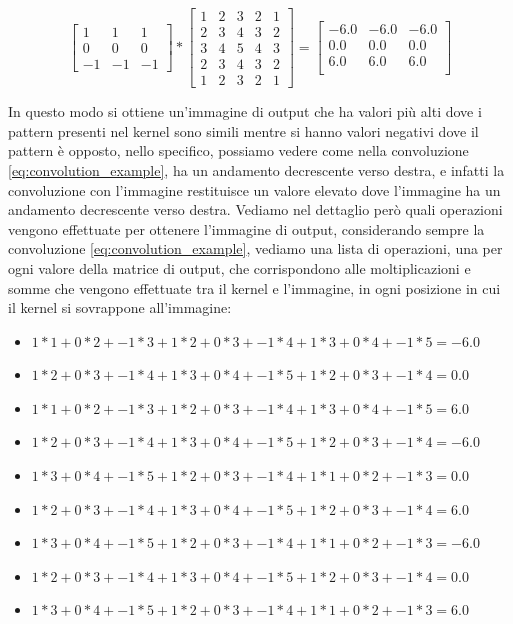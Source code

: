 \begin{equation}
    \label{eq:convolution_example_2}
    \begin{bmatrix}
        1 & 1 & 1 \\
        0 & 0 & 0 \\
        -1 & -1 & -1
    \end{bmatrix} *
    \begin{bmatrix}
        1 & 2 & 3 & 2 & 1 \\
        2 & 3 & 4 & 3 & 2 \\
        3 & 4 & 5 & 4 & 3 \\
        2 & 3 & 4 & 3 & 2 \\
        1 & 2 & 3 & 2 & 1
    \end{bmatrix} =
    \begin{bmatrix}
        -6.0 & -6.0 & -6.0 \\
        0.0 & 0.0 & 0.0 \\
        6.0 & 6.0 & 6.0 \\
    \end{bmatrix}
\end{equation}

In questo modo si ottiene un'immagine di output che ha valori più alti dove i pattern 
presenti nel kernel sono simili mentre si hanno valori negativi dove il pattern è opposto, nello specifico,
possiamo vedere come nella convoluzione \ref{eq:convolution_example}, ha un andamento decrescente verso destra, e infatti la convoluzione 
con l'immagine restituisce un valore elevato dove l'immagine ha un andamento decrescente verso destra.
Vediamo nel dettaglio però quali operazioni vengono effettuate per ottenere l'immagine di output, considerando sempre la convoluzione \ref{eq:convolution_example}, vediamo
una lista di operazioni, una per ogni valore della matrice di output, che corrispondono alle moltiplicazioni e somme che vengono effettuate tra il kernel e l'immagine, in ogni
posizione in cui il kernel si sovrappone all'immagine:
\begin{itemize}
    \item $1*1 + 0*2 + -1*3 + 1*2 + 0*3 + -1*4 + 1*3 + 0*4 + -1*5 = -6.0$
    \item $1*2 + 0*3 + -1*4 + 1*3 + 0*4 + -1*5 + 1*2 + 0*3 + -1*4 = 0.0$
    \item $1*1 + 0*2 + -1*3 + 1*2 + 0*3 + -1*4 + 1*3 + 0*4 + -1*5 = 6.0$
    \item $1*2 + 0*3 + -1*4 + 1*3 + 0*4 + -1*5 + 1*2 + 0*3 + -1*4 = -6.0$
    \item $1*3 + 0*4 + -1*5 + 1*2 + 0*3 + -1*4 + 1*1 + 0*2 + -1*3 = 0.0$
    \item $1*2 + 0*3 + -1*4 + 1*3 + 0*4 + -1*5 + 1*2 + 0*3 + -1*4 = 6.0$
    \item $1*3 + 0*4 + -1*5 + 1*2 + 0*3 + -1*4 + 1*1 + 0*2 + -1*3 = -6.0$
    \item $1*2 + 0*3 + -1*4 + 1*3 + 0*4 + -1*5 + 1*2 + 0*3 + -1*4 = 0.0$
    \item $1*3 + 0*4 + -1*5 + 1*2 + 0*3 + -1*4 + 1*1 + 0*2 + -1*3 = 6.0$
\end{itemize}

